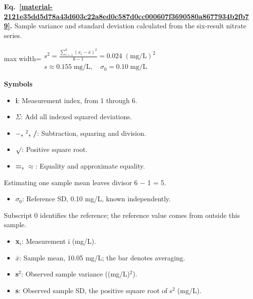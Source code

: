\documentclass[11pt,a4paper]{article}
\begin{document}
\par\medskip
\begin{samepage}
\label{material-2121e35dd5d78a43d603c22a8ed0c587d0cc000607f3690580a8677934b2fb79}
\noindent\textbf{Eq.~\ref*{material-2121e35dd5d78a43d603c22a8ed0c587d0cc000607f3690580a8677934b2fb79}.} Sample variance and standard deviation calculated from the six-result nitrate series.\par\nopagebreak
\begin{center}\begin{adjustbox}{max width=\linewidth}$\displaystyle \begin{gathered}s^2=\frac{\sum_{i=1}^{6}(x_i-\bar x)^2}{6-1}=0.024\;(\mathrm{mg/L})^2\\s\approx0.155\;\mathrm{mg/L},\quad\sigma_0=0.10\;\mathrm{mg/L}\end{gathered}$\end{adjustbox}\end{center}

\par\noindent\textbf{Symbols}

\begin{itemize}\setlength{\itemsep}{1pt}\setlength{\parsep}{0pt}
\item \textbf{i}: Measurement index, from 1 through 6.
\item \textbf{\ensuremath{\Sigma}}: Add all indexed squared deviations.
\item \textbf{\ensuremath{-}, \ensuremath{{}^2}, /}: Subtraction, squaring and division.
\item \textbf{\ensuremath{\sqrt{\vphantom{x}}}}: Positive square root.
\item \textbf{=, \ensuremath{\approx}}: Equality and approximate equality.
\end{itemize}

Estimating one sample mean leaves divisor 6 \ensuremath{-} 1 = 5.

\begin{itemize}\setlength{\itemsep}{1pt}\setlength{\parsep}{0pt}
\item \textbf{\ensuremath{\sigma}\ensuremath{{}_0}}: Reference SD, 0.10 mg/L, known independently.
\end{itemize}

Subscript 0 identifies the reference; the reference value comes from outside this sample.

\begin{itemize}\setlength{\itemsep}{1pt}\setlength{\parsep}{0pt}
\item \textbf{x\ensuremath{{}_i}}: Measurement i (mg/L).
\item \textbf{\ensuremath{\bar{x}}}: Sample mean, 10.05 mg/L; the bar denotes averaging.
\item \textbf{s\ensuremath{{}^2}}: Observed sample variance ((mg/L)\ensuremath{{}^2}).
\item \textbf{s}: Observed sample SD, the positive square root of s\ensuremath{{}^2} (mg/L).
\end{itemize}

\end{samepage}
\medskip
\end{document}

